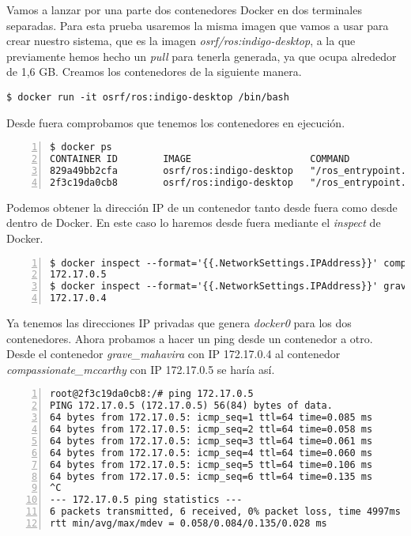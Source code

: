 	Vamos a lanzar por una parte dos contenedores Docker en dos terminales separadas. Para esta prueba usaremos la misma imagen que vamos a usar para crear nuestro sistema, que es la imagen \emph{osrf/ros:indigo-desktop}, a la que previamente hemos hecho un \emph{pull} para tenerla generada, ya que ocupa alrededor de 1,6 GB. Creamos los contenedores de la siguiente manera.
	
	\begin{lstlisting}[style=consola]
$ docker run -it osrf/ros:indigo-desktop /bin/bash
	\end{lstlisting}
	
	Desde fuera comprobamos que tenemos los contenedores en ejecución.
	
	\begin{lstlisting}[style=consola,numbers=left]
$ docker ps
CONTAINER ID        IMAGE                     COMMAND                  CREATED             STATUS              PORTS               NAMES
829a49bb2cfa        osrf/ros:indigo-desktop   "/ros_entrypoint.sh /"   6 seconds ago       Up 6 seconds                            compassionate_mccarthy
2f3c19da0cb8        osrf/ros:indigo-desktop   "/ros_entrypoint.sh /"   16 seconds ago      Up 16 seconds                           grave_mahavira
	\end{lstlisting}
	
	Podemos obtener la dirección IP de un contenedor tanto desde fuera como desde dentro de Docker. En este caso lo haremos desde fuera mediante el \emph{inspect} de Docker.
	
	\begin{lstlisting}[style=consola,numbers=left]
$ docker inspect --format='{{.NetworkSettings.IPAddress}}' compassionate_mccarthy
172.17.0.5
$ docker inspect --format='{{.NetworkSettings.IPAddress}}' grave_mahavira
172.17.0.4
	\end{lstlisting}
	
	Ya tenemos las direcciones IP privadas que genera \emph{docker0} para los dos contenedores. Ahora probamos a hacer un ping desde un contenedor a otro. Desde el contenedor \textit{grave\_mahavira} con IP 172.17.0.4 al contenedor \textit{compassionate\_mccarthy} con IP 172.17.0.5 se haría así.
	
	\begin{lstlisting}[style=consola,numbers=left]
root@2f3c19da0cb8:/# ping 172.17.0.5
PING 172.17.0.5 (172.17.0.5) 56(84) bytes of data.
64 bytes from 172.17.0.5: icmp_seq=1 ttl=64 time=0.085 ms
64 bytes from 172.17.0.5: icmp_seq=2 ttl=64 time=0.058 ms
64 bytes from 172.17.0.5: icmp_seq=3 ttl=64 time=0.061 ms
64 bytes from 172.17.0.5: icmp_seq=4 ttl=64 time=0.060 ms
64 bytes from 172.17.0.5: icmp_seq=5 ttl=64 time=0.106 ms
64 bytes from 172.17.0.5: icmp_seq=6 ttl=64 time=0.135 ms
^C
--- 172.17.0.5 ping statistics ---
6 packets transmitted, 6 received, 0% packet loss, time 4997ms
rtt min/avg/max/mdev = 0.058/0.084/0.135/0.028 ms
	\end{lstlisting}
	
